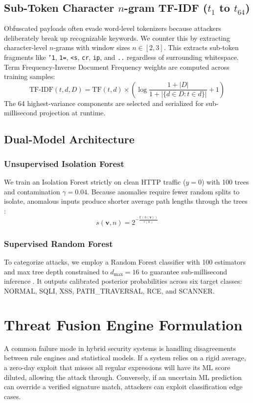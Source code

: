 \documentclass[conference]{IEEEtran}
\begin{document}
\subsection{Sub-Token Character $n$-gram TF-IDF ($t_1$ to $t_{64}$)}
Obfuscated payloads often evade word-level tokenizers because attackers deliberately break up recognizable keywords. We counter this by extracting character-level $n$-grams with window sizes $n \in [2, 3]$. This extracts sub-token fragments like \texttt{'1}, \texttt{1=}, \texttt{<s}, \texttt{cr}, \texttt{ip}, and \texttt{..} regardless of surrounding whitespace. Term Frequency-Inverse Document Frequency weights are computed across training samples:
\begin{equation}
\text{TF-IDF}(t, d, D) = \text{TF}(t, d) \times \left( \log \frac{1 + |D|}{1 + |\{d \in D : t \in d\}|} + 1 \right)
\end{equation}
The 64 highest-variance components are selected and serialized for sub-millisecond projection at runtime.

\subsection{Dual-Model Architecture}
\subsubsection{Unsupervised Isolation Forest}
We train an Isolation Forest strictly on clean HTTP traffic ($y = 0$) with 100 trees and contamination $\gamma = 0.04$. Because anomalies require fewer random splits to isolate, anomalous inputs produce shorter average path lengths through the trees \cite{liu2008}:
\begin{equation}
s(\mathbf{v}, n) = 2^{-\frac{\mathbb{E}(h(\mathbf{v}))}{c(n)}}
\end{equation}

\subsubsection{Supervised Random Forest}
To categorize attacks, we employ a Random Forest classifier with 100 estimators and max tree depth constrained to $d_{\max} = 16$ to guarantee sub-millisecond inference \cite{breiman2001}. It outputs calibrated posterior probabilities across six target classes: NORMAL, SQLI, XSS, PATH\_TRAVERSAL, RCE, and SCANNER.

\section{Threat Fusion Engine Formulation}
A common failure mode in hybrid security systems is handling disagreements between rule engines and statistical models. If a system relies on a rigid average, a zero-day exploit that misses all regular expressions will have its ML score diluted, allowing the attack through. Conversely, if an uncertain ML prediction can override a verified signature match, attackers can exploit classification edge cases.
\end{document}

